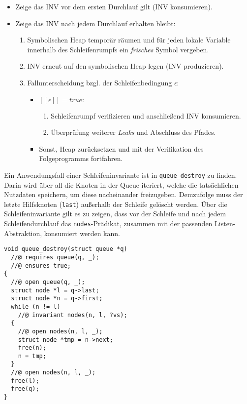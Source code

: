\begin{itemize}
	\item Zeige das INV vor dem ersten Durchlauf gilt (INV konsumieren).
	\item Zeige das INV nach jedem Durchlauf erhalten bleibt:
	\begin{enumerate}
		\item Symbolischen Heap temporär räumen und für jeden lokale Variable innerhalb des Schleifenrumpfs ein \emph{frisches} Symbol vergeben.
		\item INV erneut auf den symbolischen Heap legen (INV produzieren).
		\item Fallunterscheidung bzgl. der Schleifenbedingung $\epsilon$:
		\begin{itemize}
			\item $[\![\epsilon]\!] = true:$
			\begin{enumerate}
				\item Schleifenrumpf verifizieren und anschließend INV konsumieren.
				\item Überprüfung weiterer \emph{Leaks} und Abschluss des Pfades.
			\end{enumerate}
			\item Sonst, Heap zurücksetzen und mit der Verifikation des Folgeprogramms fortfahren.
		\end{itemize}
	\end{enumerate}
\end{itemize}

\noindent
Ein Anwendungsfall einer Schleifeninvariante ist in \texttt{queue\_destroy} zu finden. Darin wird über all die Knoten in der Queue iteriert, welche die tatsächlichen Nutzdaten speichern, um diese nacheinander freizugeben. Demzufolge muss der letzte Hilfsknoten (\texttt{last}) außerhalb der Schleife gelöscht werden. Über die Schleifeninvariante gilt es zu zeigen, dass vor der Schleife und nach jedem Schleifendurchlauf das \texttt{nodes}-Prädikat, zusammen mit der passenden Listen-Abstraktion, konsumiert werden kann. 

\begin{lstlisting}
void queue_destroy(struct queue *q)
  //@ requires queue(q, _);
  //@ ensures true;
{
  //@ open queue(q, _);
  struct node *l = q->last;
  struct node *n = q->first;
  while (n != l)
    //@ invariant nodes(n, l, ?vs);
  {
    //@ open nodes(n, l, _);
    struct node *tmp = n->next;
    free(n);
    n = tmp;
  }
  //@ open nodes(n, l, _);
  free(l);
  free(q);
}
\end{lstlisting}

